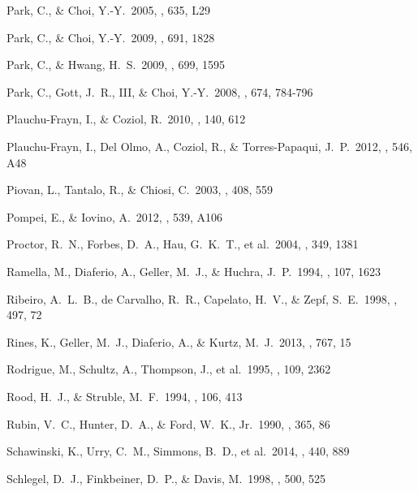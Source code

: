 \documentclass[12pt,preprint,apj]{emulateapj}
\begin{document}
\begin{thebibliography}{}
 Park, C., \& Choi, Y.-Y.\ 2005, \apjl, 635, L29

 Park, C., \& Choi, Y.-Y.\ 2009, \apj, 691, 1828 

 Park, C., \& Hwang, H.~S.\ 2009, \apj, 699, 1595 

 Park, C., Gott, J.~R., III, \& Choi, Y.-Y.\ 2008, \apj, 674, 784-796 

 Plauchu-Frayn, I., \& Coziol, R.\ 2010, \aj, 140, 612

 Plauchu-Frayn, I., Del Olmo, A., Coziol, R., \& Torres-Papaqui, J.~P.\ 2012, \aap, 546, A48 

 Piovan, L., Tantalo, R., \& Chiosi, C.\ 2003, \aap, 408, 559

 Pompei, E., \& Iovino, A.\ 2012, \aap, 539, A106

 Proctor, R.~N., Forbes, D.~A., Hau, G.~K.~T., et al.\ 2004, \mnras, 349, 1381

 Ramella, M., Diaferio, A., Geller, M.~J., \& Huchra, J.~P.\ 1994, \aj, 107, 1623

 Ribeiro, A.~L.~B., de Carvalho, R.~R., Capelato, H.~V., \& Zepf, S.~E.\ 1998, \apj, 497, 72

 Rines, K., Geller, M.~J., Diaferio, A., \& Kurtz, M.~J.\ 2013, \apj, 767, 15

 Rodrigue, M., Schultz, A., Thompson, J., et al.\ 1995, \aj, 109, 2362


 Rood, H.~J., \& Struble, M.~F.\ 1994, \pasp, 106, 413

 Rubin, V.~C., Hunter, D.~A., \& Ford, W.~K., Jr.\ 1990, \apj, 365, 86 

 Schawinski, K., Urry, C.~M., Simmons, B.~D., et al.\ 2014, \mnras, 440, 889 

 Schlegel, D.~J., Finkbeiner, D.~P., \& Davis, M.\ 1998, \apj, 500, 525


\end{thebibliography}
\end{document}
